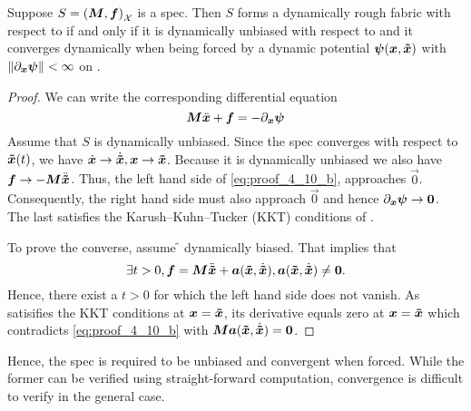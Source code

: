\begin{theorem}[Dynamic Fabrics]
Suppose $S={(\bm{M},\bm{f})}_{\mathcal{X}}$ is a spec.  Then $S$ forms a dynamically rough fabric with
respect to \xt{} if and only if it is dynamically unbiased with respect to \xt{} and it
converges dynamically when being forced by a dynamic potential $\bm{\psi}(\bm{x},\bm{\tilde{x}})$ with
$\left\lVert\partial_{\bm{x}}\bm{\psi}\right\rVert < \infty$ on \X{}.%
\label{the:dynamic_fabrics}
\end{theorem}

\begin{proof}
We can write the corresponding differential equation
\begin{equation}
  \bm{M}\ddot{\bm{x}} + \bm{f} = -\partial_{\bm{x}}\bm{\psi}
  \label{eq:proof_4_10_b}
\end{equation}
Assume that $S$ is dynamically unbiased.
Since the spec converges with respect to $\bm{\tilde{x}}(t)$, we have $\dot{\bm{x}}\to\dot{\bm{\tilde{x}}}, \bm{x}\to\bm{\tilde{x}}$.
Because it is dynamically unbiased we also have $\bm{f}\to-\bm{M}\ddot{\bm{\tilde{x}}}$.
Thus, the left hand side of
\cref{eq:proof_4_10_b}, approaches $\vec{0}$.
Consequently, the right hand side must also
approach $\vec{0}$ and hence $\partial_{\bm{x}}\bm{\psi} \to \bm{0}$. The last satisfies the 
Karush–Kuhn–Tucker (KKT)
conditions of \forc{}.

To prove the converse, assume \f{} dynamically biased. That implies that 
\[
  \exists t > 0, \bm{f} = \bm{M}\ddot{\bm{\tilde{x}}} + \bm{a}(\bm{\tilde{x}}, \dot{\bm{\tilde{x}}}),
    \bm{a}(\bm{\tilde{x}}, \dot{\bm{\tilde{x}}}) \neq \bm{0}.
\]
Hence, there exist a $t > 0$ for which the left hand side does not vanish. As \forc{}
satisifies the KKT conditions at $\bm{x} = \bm{\tilde{x}}$, its derivative equals zero at $\bm{x} = \bm{\tilde{x}}$ which contradicts
\cref{eq:proof_4_10_b} with $\bm{M}\bm{a}(\bm{\tilde{x}}, \dot{\bm{\tilde{x}}}) = \bm{0}$.
\end{proof}

Hence, the spec is required to be unbiased and convergent when forced. While the former
can be verified using straight-forward computation, convergence is difficult to verify in
the general case. 

